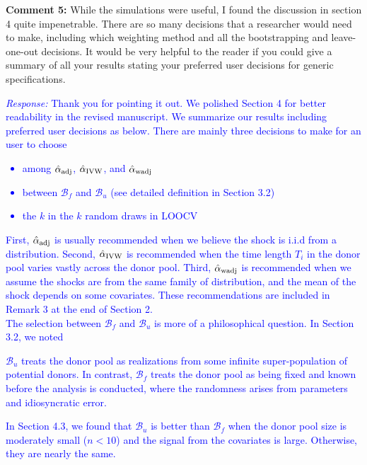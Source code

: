 \documentclass[12pt]{article}
\newcommand{\response}[1]{\noindent \textcolor{blue}{\emph{Response:} #1}}
\begin{document}
{\bf Comment 5:} While the simulations were useful, I found the discussion in section 4 quite impenetrable. There are so many decisions that a researcher would need to make, including which weighting method and all the bootstrapping and leave-one-out decisions. It would be very helpful to the reader if you could give a summary of all your results stating your preferred user decisions for generic specifications. \\

\response{Thank you for pointing it out. We polished Section 4 for better readability in the revised manuscript. We  summarize  our results including preferred user decisions as below. There are mainly three decisions to make for an user to choose 
  \begin{itemize}
    \item among  $\hat{\alpha}_{\rm adj}$, $\hat{\alpha}_{\rm IVW}$, and $\hat{\alpha}_{\rm wadj}$ 
    \item between $\mathcal{B}_f$ and $\mathcal{B}_u$ (see detailed definition in Section 3.2)
    \item the $k$ in the $k$ random draws in LOOCV
  \end{itemize}
  First, $\hat{\alpha}_{\rm adj}$ is usually recommended when we believe the shock is i.i.d from a distribution. Second, $\hat{\alpha}_{\rm IVW}$ is recommended when the time length $T_i$ in the donor pool varies vastly across the donor pool. Third, $\hat{\alpha}_{\rm wadj}$  is recommended when we assume the shocks are from the same family of distribution, and the mean of the shock depends on some covariates. These recommendations are included in Remark 3 at the end of Section 2. \\
  
  The selection between $\mathcal{B}_f$ and $\mathcal{B}_u$ is more of a philosophical question. In Section 3.2,  we noted
  
  \begin{tcolorbox}
  $\mathcal{B}_u$ treats the donor pool as realizations from some infinite super-population of potential donors. In contrast, $\mathcal{B}_f$ treats the donor pool as being fixed  and known before the analysis is conducted, where the randomness arises from parameters and idiosyncratic error.   
  \end{tcolorbox}

In Section 4.3, we found that $\mathcal{B}_u$ is better than $\mathcal{B}_f$ when  the donor pool size is moderately small ($n< 10$) and the signal from the covariates is large. Otherwise, they are nearly the same. \\


}
\end{document}
